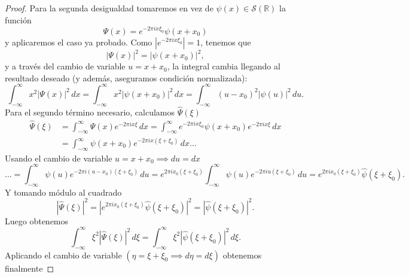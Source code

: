 \documentclass[12pt]{article}
\newcommand{\Sc}{\mathcal{S}(\mathbb{R})}
\theoremstyle{plain}
\theoremstyle{definition}
\numberwithin{equation}{section}
\begin{document}
\begin{proof}
            Para la segunda desigualdad tomaremos en vez de \(\psi(x) \in \Sc\) la función $$\Psi(x) = e^{-2\pi ix\xi_0}\psi(x+x_0)$$ y aplicaremos el caso ya probado.
            Como \(\left\lvert e^{-2\pi ix\xi_0}\right\rvert = 1\), tenemos que $$\left\lvert \Psi(x) \right\rvert^2 = \left\lvert \psi(x+x_0) \right\rvert^2,$$ y a través del cambio de variable \(u = x+x_0\), la integral cambia llegando al resultado deseado (y además, aseguramos condición normalizada):
            \begin{equation}
                \label{primertermheisen}
                \int_{-\infty}^{\infty} x^2 \left\lvert \Psi(x) \right\rvert^2 \,dx = \int_{-\infty}^{\infty} x^2 \left\lvert \psi(x+x_0) \right\rvert^2 \,dx = \int_{-\infty}^{\infty} (u-x_0)^2 \left\lvert \psi(u) \right\rvert^2 \,du.
            \end{equation}
            Para el segundo término necesario, calculamos \(\widehat{\Psi}(\xi)\)
            \begin{align*}
                \widehat{\Psi}(\xi) &= \int_{-\infty}^{\infty} \Psi(x) e^{-2\pi ix\xi} \,dx = \int_{-\infty}^{\infty} e^{-2\pi ix\xi_0} \psi(x+x_0) e^{-2\pi ix\xi} \,dx \\
                &= \int_{-\infty}^{\infty} \psi(x+x_0) e^{-2\pi ix(\xi+\xi_0)} \,dx\dots
            \end{align*}
            Usando el cambio de variable \(u = x+x_0 \implies du = dx\)
            \begin{equation*}
                \dots = \int_{-\infty}^{\infty} \psi(u) e^{-2\pi i(u-x_0)(\xi+\xi_0)} \,du = e^{2\pi ix_0(\xi+\xi_0)} \int_{-\infty}^{\infty} \psi(u) e^{-2\pi iu(\xi+\xi_0)} \,du = e^{2\pi ix_0(\xi+\xi_0)} \hat{\psi}(\xi+\xi_0).
            \end{equation*}
            Y tomando módulo al cuadrado
            \begin{equation*}
                \left\lvert \widehat{\Psi}(\xi) \right\rvert^2 = \left\lvert e^{2\pi ix_0(\xi+\xi_0)} \hat{\psi}(\xi+\xi_0) \right\rvert^2 = \left\lvert \hat{\psi}(\xi+\xi_0) \right\rvert^2.
            \end{equation*}
            Luego obtenemos
            \begin{equation*}
                \int_{-\infty}^{\infty} \xi^2 \left\lvert \widehat{\Psi}(\xi) \right\rvert^2 \,d\xi = \int_{-\infty}^{\infty} \xi^2 \left\lvert \hat{\psi}(\xi+\xi_0) \right\rvert^2 \,d\xi.
            \end{equation*}
            Aplicando el cambio de variable \(\left( \eta = \xi+\xi_0 \implies d\eta = d\xi \right)\) obtenemos finalmente

\end{proof}
\end{document}
